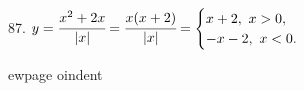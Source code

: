 87. $y=\cfrac{x^2+2x}{|x|}=\cfrac{x(x+2)}{|x|}=\begin{cases} x+2,\ x>0,\\ -x-2,\ x<0.\end{cases}$\\
\begin{figure}[ht!]
\end{figure}
ewpage
oindent

